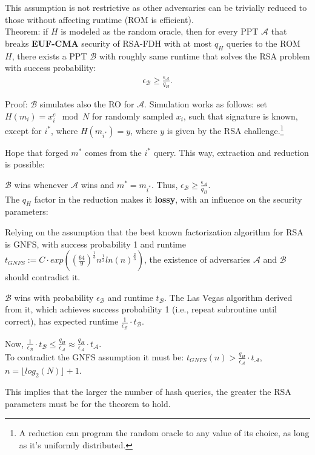 \documentclass[oneside]{book}
\newcommand{\cA}[0]{\mathcal{A}}
\newcommand{\cB}[0]{\mathcal{B}}
\begin{document}
This assumption is not restrictive as other adversaries can be trivially reduced to those without affecting runtime (ROM is efficient).\\

Theorem: if $H$ is modeled as the random oracle, then for every PPT $\cA$ that breaks \textbf{EUF-CMA} security of RSA-FDH with at most $q_H$ queries to the ROM $H$, there exists a PPT $\cB$ with roughly same runtime that solves the RSA problem with success probability:
\begin{align}
    \epsilon_\cB \ge \frac{\epsilon_\cA}{q_H}.
\end{align}

Proof: $\cB$ simulates also the RO for $\cA$. Simulation works as follows: set $H(m_i) = x_i^e \mod N$ for randomly sampled $x_i$, such that signature is known, except for $i^*$, where $H(m_{i^*}) = y$, where $y$ is given by the RSA challenge.\footnote{A reduction can program the random oracle to any value of its choice, as long as it's uniformly distributed.}

Hope that forged $m^*$ comes from the $i^*$ query. This way, extraction and reduction is possible:

$\cB$ wins whenever $\cA$ wins and $m^* = m_{i^*}$. Thus, $\epsilon_\cB \ge \frac{\epsilon_\cA}{q_H}$.\\

The $q_H$ factor in the reduction makes it \textbf{lossy}, with an influence on the security parameters:

Relying on the assumption that the best known factorization algorithm for RSA is GNFS, with success probability 1 and runtime $t_{GNFS} := C \cdot exp((\frac{64}{9})^{\frac{1}{3}}n^{\frac{1}{3}}ln(n)^\frac{2}{3})$, the existence of adversaries $\cA$ and $\cB$ should contradict it.

$\cB$ wins with probability $\epsilon_\cB$ and runtime $t_\cB$. The Las Vegas algorithm derived from it, which achieves success probability 1 (i.e., repeat subroutine until correct), has expected runtime $\frac{1}{\epsilon_\cB} \cdot t_\cB$.

Now, $\frac{1}{\epsilon_\cB} \cdot t_\cB \le \frac{q_H}{\epsilon_\cA} \approx \frac{q_H}{\epsilon_\cA} \cdot t_\cA$.\\

To contradict the GNFS assumption it must be: $t_{GNFS}(n) > \frac{q_H}{\epsilon_\cA} \cdot t_\cA$, $n = \lfloor log_2(N) \rfloor + 1$.

This implies that the larger the number of hash queries, the greater the RSA parameters must be for the theorem to hold.\\
\end{document}
